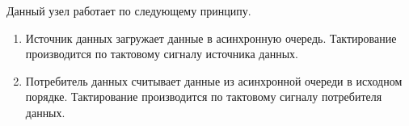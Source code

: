 Данный узел работает по следующему принципу. 
\begin{enumerate}
	\item Источник данных загружает данные в асинхронную очередь. Тактирование производится по тактовому сигналу источника данных.
	\item Потребитель данных считывает данные из асинхронной очереди в исходном порядке. Тактирование производится по тактовому сигналу потребителя данных. 
\end{enumerate}



